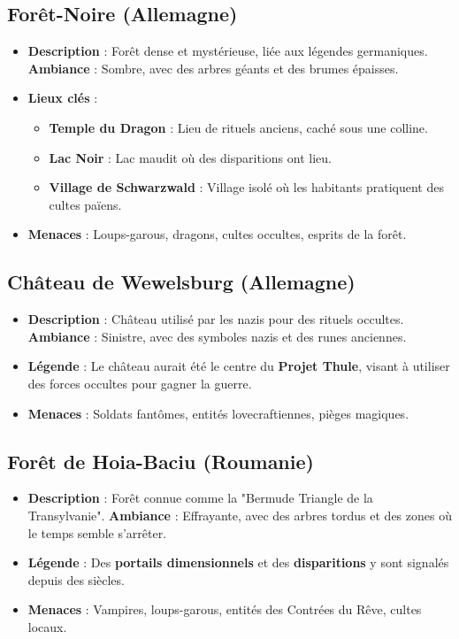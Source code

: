 \documentclass[10pt,a5paper,twoside]{book}
\begin{document}
\subsection{Forêt-Noire (Allemagne)}
\begin{itemize}
	\item \textbf{Description} : Forêt dense et mystérieuse, liée aux légendes germaniques. \textbf{Ambiance} : Sombre, avec des arbres géants et des brumes épaisses.
	\item \textbf{Lieux clés} :
	\begin{itemize}
		\item \textbf{Temple du Dragon} : Lieu de rituels anciens, caché sous une colline.
		\item \textbf{Lac Noir} : Lac maudit où des disparitions ont lieu.
		\item \textbf{Village de Schwarzwald} : Village isolé où les habitants pratiquent des cultes païens.
	\end{itemize}
	\item \textbf{Menaces} : Loups-garous, dragons, cultes occultes, esprits de la forêt.
\end{itemize}

\subsection{Château de Wewelsburg (Allemagne)}
\begin{itemize}
	\item \textbf{Description} : Château utilisé par les nazis pour des rituels occultes. \textbf{Ambiance} : Sinistre, avec des symboles nazis et des runes anciennes.
	\item \textbf{Légende} : Le château aurait été le centre du \textbf{Projet Thule}, visant à utiliser des forces occultes pour gagner la guerre.
	\item \textbf{Menaces} : Soldats fantômes, entités lovecraftiennes, pièges magiques.
\end{itemize}

\subsection{Forêt de Hoia-Baciu (Roumanie)}
\begin{itemize}
	\item \textbf{Description} : Forêt connue comme la "Bermude Triangle de la Transylvanie". \textbf{Ambiance} : Effrayante, avec des arbres tordus et des zones où le temps semble s'arrêter.
	\item \textbf{Légende} : Des \textbf{portails dimensionnels} et des \textbf{disparitions} y sont signalés depuis des siècles.
	\item \textbf{Menaces} : Vampires, loups-garous, entités des Contrées du Rêve, cultes locaux.
\end{itemize}
\end{document}
